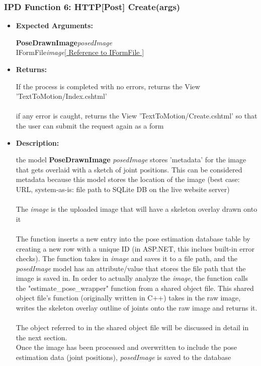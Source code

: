 \documentclass{scrreprt}
\begin{document}
\subsubsection{IPD Function 6: HTTP[Post] Create(args)}
\begin{itemize}
    \item \textbf{Expected Arguments:}

    \textbf{PoseDrawnImage}\quad\textit{posedImage}
    \\
    IFormFile\quad\textit{image}\quad\quad\quad\href{https://docs.microsoft.com/en-us/aspnet/core/api/microsoft.aspnetcore.http.iformfile}{[ Reference to IFormFile ]}

    \item \textbf{Returns:}

    If the process is completed with no errors, returns the View 'TextToMotion/Index.cshtml'
    \\\\
    if any error is caught, returns the View 'TextToMotion/Create.cshtml' so that the user can submit the request again as a form

    \item \textbf{Description:}

    the model \textbf{PoseDrawnImage} \textit{posedImage} stores 'metadata' for the image that gets overlaid with a sketch of joint positions. This can be considered metadata because this model stores the location of the image (best case: URL, system-as-is: file path to SQLite DB on the live website server)
    \\\\
    The \textit{image} is the uploaded image that will have a skeleton overlay drawn onto it
    \\\\
    The function inserts a new entry into the pose estimation database table by creating a new row with a unique ID (in ASP.NET, this inclues built-in error checks). The function takes in \textit{image} and saves it to a file path, and the \textit{posedImage} model has an attribute/value that stores the file path that the image is saved in. In order to actually analyze the \textit{image}, the function calls the "estimate\_pose\_wrapper" function from a shared object file. This shared object file's function (originally written in C++) takes in the raw image, writes the skeleton overlay outline of joints onto the raw image and returns it.
    \\\\
    The object referred to in the shared object file will be discussed in detail in the next section.
    \\
    Once the image has been processed and overwritten to include the pose estimation data (joint positions), \textit{posedImage} is saved to the database


\end{itemize}
\end{document}

